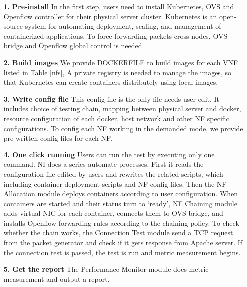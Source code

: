 \documentclass{sig-alternate-10pt}
\begin{document}
\begin{itemize}
\item[\textbf{1.}]{}\textbf{Pre-install}
In the first step, users need to install Kubernetes, OVS
and Openflow controller for their physical server cluster.
Kubernetes is an open-source system for automating deployment, scaling,
and management of containerized applications.
To force forwarding packets cross nodes,
OVS bridge and Openflow global control is needed.

\item[\textbf{2.}]{}\textbf{Build images}
We provide DOCKERFILE to build images for each VNF listed in Table \ref{nfs},
A private registry is needed to manage the images,
so that Kubernetes can create containers distributely using local images.

\item[\textbf{3.}]{}\textbf{Write config file}
This config file is the only file needs user edit.
It includes choice of testing chain,
mapping between physical server and docker,
resource configuration of each docker,
host network and other NF specific configurations.
To config each NF working in the demanded mode,
we provide pre-written config files for each NF.

\item[\textbf{4.}]{}\textbf{One click running}
Users can run the test by executing only one command.
NI does a series automate processes.
First it reads the configuration file edited by users and rewrites the related scripts,
which including container deployment scripts and NF config files.
Then the NF Allocation module deploys containers according to user configuration.
When containers are started and their status turn to `ready',
NF Chaining module adds virtual NIC for each container,
connects them to OVS bridge,
and installs Openflow forwarding rules according to the chaining policy.
To check whether the chain works,
the Connection Test module send a TCP request
from the packet generator and check if it gets response from Apache server.
If the connection test is passed,
the test is run and metric measurement begins.

\item[\textbf{5.}]{}\textbf{Get the report}
The Performance Monitor module does metric measurement
and output a report.

\end{itemize}

\end{document}
